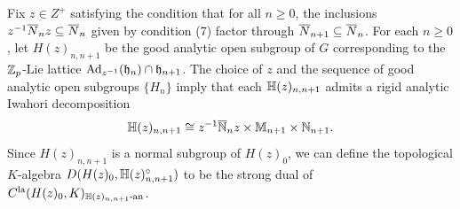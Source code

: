 \documentclass[10pt]{amsart}
\begin{document}

Fix $z\in Z^{+}$ satisfying the condition that for all $n\geq 0$, the inclusions $z^{-1}\overline{N}_{n}z\subseteq\overline{N}_{n}$ given by condition (7) factor through $\overline{N}_{n+1}\subseteq\overline{N}_{n}$. For each $n\geq 0$, let $H(z)_{n,n+1}$ be the good analytic open subgroup of $G$ corresponding to the $\mathbb{Z}_{p}$-Lie lattice $\textnormal{Ad}_{z^{-1}}(\mathfrak{h}_{n})\cap \mathfrak{h}_{n+1}$. The choice of $z$ and the sequence of good analytic open subgroups $\{H_{n}\}$ imply that each $\mathbb{H}(z)_{n,n+1}$ admits a rigid analytic Iwahori decomposition \[
    \mathbb{H}(z)_{n,n+1} \cong z^{-1}\overline{\mathbb{N}}_{n}z\times \mathbb{M}_{n+1} \times \mathbb{N}_{n+1}.
\] 
Since $H(z)_{n,n+1}$ is a normal subgroup of $H(z)_{0}$, we can define the topological $K$-algebra $D(H(z)_{0},\mathbb{H}(z)_{n,n+1}^{\circ})$ to be the strong dual of $C^{\textnormal{la}}(H(z)_{0},K)_{\mathbb{H}(z)_{n,n+1}\textnormal{-an}}$. 
\end{document}
